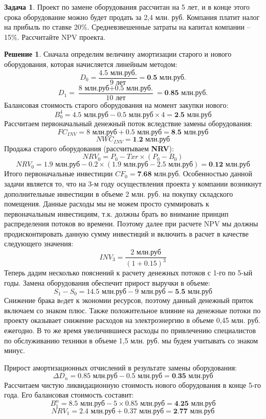 \documentclass[a4paper, 14pt]{article}
\theoremstyle{plain} %
\theoremstyle{definition} %
\newtheorem*{solution}{Решение}
\newtheorem{problem}{Задача}[subsection]
\theoremstyle{remark} %
\begin{document}
\begin{problem}
	Проект  по  замене  оборудования  рассчитан  на  5  лет,  и  в  конце  этого  срока оборудование можно будет продать за 2,4 млн. руб. Компания платит налог на прибыль по ставке 20\%. Средневзвешенные затраты на капитал компании –15\%. Рассчитайте NPV проекта.
    \begin{solution}
			Сначала определим величину амортизации старого и нового оборудования, которая начисляется линейным методом:
			\[
				D_{0} = \frac{\text{4.5 млн.руб.}}{\text{9 лет}} = \textbf{0.5 млн.руб.}
			\]
			\[
				D_{1} = \frac{\text{8 млн.руб} + \text{0.5 млн.руб.}}{\text{10 лет}} = \textbf{0.85 млн.руб.}
			\]
			Балансовая стоимость старого оборудования на момент закупки нового:
			\[
				B_{0}^{4} = \text{4.5 млн.руб} - \text{0.5 млн.руб} \times 4 = \textbf{2.5 млн.руб}
			\]
			Рассчитаем первоначальный денежный поток вследствие замены оборудования:
			\[
				FC_{INV} = \text{8 млн.руб}+\text{0.5 млн.руб} = \textbf{8.5 млн.руб}
			\]
			\[
				NWC_{INV} = \textbf{1.2 млн.руб}
			\]
			Продажа старого оборудования (рассчитываем \textbf{NRV}):
			\[
				NRV_{0} = P_{0} - Txr \times (P_0 - B_0)
			\]
			\[
				NRV_{0} = \text{1.9 млн.руб} - 0.2 \times (\text{1.9 млн.руб} - \text{2.5 млн.руб}) = \textbf{0.12 млн.руб}
			\]
			Итого первоначальные инвестиции $CF_0 = \textbf{7.68 млн.руб.}$
			Особенностью данной задачи является то, что на 3-м году осуществления проекта у компании возникнут дополнительные инвестиции в объеме 2 млн. руб. на покупку складского помещения. Данные расходы мы не можем просто суммировать к первоначальным инвестициям, т.к. должны брать во внимание принцип распределения потоков во времени. Поэтому далее при расчете NPV мы должны продисконтировать данную сумму инвестиций и включить в расчет в качестве следующего значения:
			\[
				INV_3 = \frac{\text{2 млн.руб}}{(1 + 0.15)^{3}}
			\]
			Теперь дадим несколько пояснений к расчету денежных потоков с 1-го по 5-ый годы. Замена оборудования обеспечит прирост выручки в объеме:
			\[
				S_{1} - S_{0} = \text{14.5 млн.руб} - \text{9 млн.руб} = \textbf{5.5 млн.руб}
			\]
			Снижение брака вeдет к экономии ресурсов, поэтому данный денежный приток включаем со знаком плюс. Также положительное влияние на денежные потоки по проекту оказывает снижение расходов на электроэнергию в объеме 0,45 млн. руб. ежегодно. В то же время увеличившиеся расходы по привлечению специалистов по обслуживанию техники в объеме 1,5 млн. руб. мы будем учитывать со знаком минус.

			Прирост амортизационных отчислений в результате замены оборудования:
			\[
				\Delta D_{n} = \text{0.85 млн.руб} - \text{0.5 млн.руб} = \textbf{0.35 млн.руб}
			\]
			Рассчитаем чистую ликвидационную стоимость нового оборудования в конце 5-го года. Его балансовая стоимость составит:
			\[
				B_{1}^{n} = \text{8.5 млн.руб} - 5 \times \text{0.85 млн.руб} = \textbf{4.25 млн.руб}
			\]
			\[
				NRV_1 = \text{2.4 млн.руб} + \text{0.37 млн.руб} = \textbf{2.77 млн.руб}
			\]


\end{solution}
\end{problem}
\end{document}
